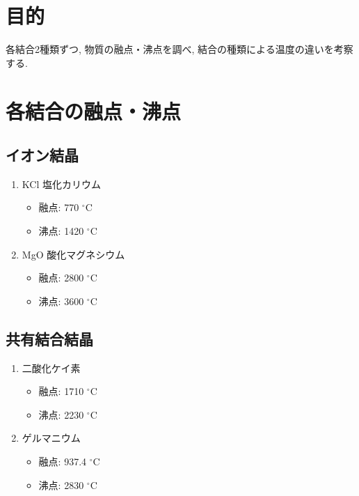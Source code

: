 \documentclass[dvipdfmx, a4paper]{jsarticle}
\begin{document}
  \begin{twocolumn}
  \section{目的}
    各結合2種類ずつ, 物質の融点・沸点を調べ, 結合の種類による温度の違いを考察する. 
  \section{各結合の融点・沸点}
    \subsection{イオン結晶}
      \begin{enumerate}
        \item KCl 塩化カリウム\cite{KCl}
        \begin{itemize}
          \item 融点: 770 ${}^{\circ}$C
          \item 沸点: 1420 ${}^{\circ}$C
        \end{itemize}
        \item MgO 酸化マグネシウム\cite{MgO}
        \begin{itemize}
          \item 融点: 2800 ${}^{\circ}$C
          \item 沸点: 3600 ${}^{\circ}$C
        \end{itemize}
      \end{enumerate}

    \subsection{共有結合結晶}
      \begin{enumerate}
        \item {} 二酸化ケイ素\cite{SiO2}
        \begin{itemize}
          \item 融点: 1710 ${}^{\circ}$C
          \item 沸点: 2230 ${}^{\circ}$C
        \end{itemize}
        \item {} ゲルマニウム\cite{Ge}
        \begin{itemize}
          \item 融点: 937.4 ${}^{\circ}$C
          \item 沸点: 2830 ${}^{\circ}$C
        \end{itemize}
      \end{enumerate}


\end{twocolumn}
\end{document}
